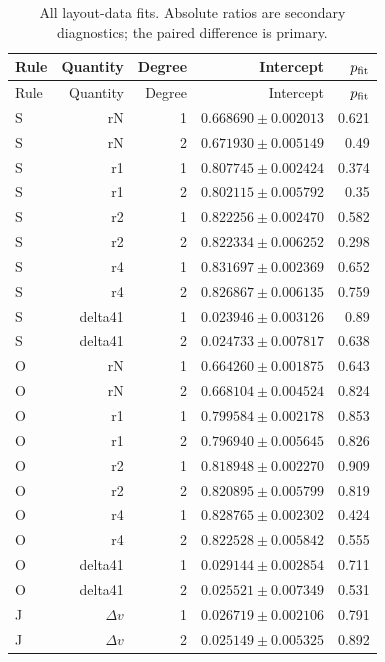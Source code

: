 {\small\setlength{\tabcolsep}{3.5pt}
\begin{longtable}{lrrrr}
\caption{All layout-data fits. Absolute ratios are secondary diagnostics; the paired difference is primary.}\\
\toprule
Rule & Quantity & Degree & Intercept & $p_{\rm fit}$\\
\midrule
\endfirsthead
\toprule
Rule & Quantity & Degree & Intercept & $p_{\rm fit}$\\
\midrule
\endhead
\bottomrule\endfoot
S & rN & 1 & $0.668690\pm0.002013$ & 0.621\\
S & rN & 2 & $0.671930\pm0.005149$ & 0.49\\
S & r1 & 1 & $0.807745\pm0.002424$ & 0.374\\
S & r1 & 2 & $0.802115\pm0.005792$ & 0.35\\
S & r2 & 1 & $0.822256\pm0.002470$ & 0.582\\
S & r2 & 2 & $0.822334\pm0.006252$ & 0.298\\
S & r4 & 1 & $0.831697\pm0.002369$ & 0.652\\
S & r4 & 2 & $0.826867\pm0.006135$ & 0.759\\
S & delta41 & 1 & $0.023946\pm0.003126$ & 0.89\\
S & delta41 & 2 & $0.024733\pm0.007817$ & 0.638\\
O & rN & 1 & $0.664260\pm0.001875$ & 0.643\\
O & rN & 2 & $0.668104\pm0.004524$ & 0.824\\
O & r1 & 1 & $0.799584\pm0.002178$ & 0.853\\
O & r1 & 2 & $0.796940\pm0.005645$ & 0.826\\
O & r2 & 1 & $0.818948\pm0.002270$ & 0.909\\
O & r2 & 2 & $0.820895\pm0.005799$ & 0.819\\
O & r4 & 1 & $0.828765\pm0.002302$ & 0.424\\
O & r4 & 2 & $0.822528\pm0.005842$ & 0.555\\
O & delta41 & 1 & $0.029144\pm0.002854$ & 0.711\\
O & delta41 & 2 & $0.025521\pm0.007349$ & 0.531\\
J & $\Delta v$ & 1 & $0.026719\pm0.002106$ & 0.791\\
J & $\Delta v$ & 2 & $0.025149\pm0.005325$ & 0.892\\
\end{longtable}}
